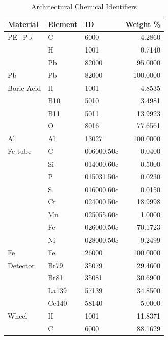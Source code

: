 \documentclass[preprint, 12pt]{elsarticle}
\begin{document}
\begin{table}[H]
    \centering
    \caption{Architectural Chemical Identifiers}
    \begin{tabular}{lllr}
    \hline
    Material   & Element   & ID         &   Weight \% \\
    \hline
    PE+Pb      & C         & 6000       &     4.2860 \\
                & H         & 1001       &     0.7140 \\
                & Pb        & 82000      &    95.0000 \\
    \hline
    Pb         & Pb        & 82000      &   100.0000 \\
    \hline
    Boric Acid & H         & 1001       &     4.8535 \\
                & B10       & 5010       &     3.4981 \\
                & B11       & 5011       &    13.9923 \\
                & O         & 8016       &    77.6561 \\
    \hline
    Al         & Al        & 13027      &   100.0000 \\
    \hline
    Fe-tube    & C         & 006000.50c &     0.0400 \\
                & Si        & 014000.60c &     0.5000 \\
                & P         & 015031.50c &     0.0230 \\
                & S         & 016000.60c &     0.0150 \\
                & Cr        & 024000.50c &    18.9998 \\
                & Mn        & 025055.60c &     1.0000 \\
                & Fe        & 026000.50c &    70.1723 \\
                & Ni        & 028000.50c &     9.2499 \\
    \hline
    Fe         & Fe        & 26000      &   100.0000 \\
    \hline
    Detector   & Br79      & 35079      &    29.4600 \\
                & Br81      & 35081      &    30.6900 \\
                & La139     & 57139      &    34.8500 \\
                & Ce140     & 58140      &     5.0000 \\
    \hline
    Wheel      & H         & 1001       &    11.8371 \\
                & C         & 6000       &    88.1629 \\
    \hline
    \end{tabular}
    \label{tab:arch_identifiers}
\end{table}
\end{document}
